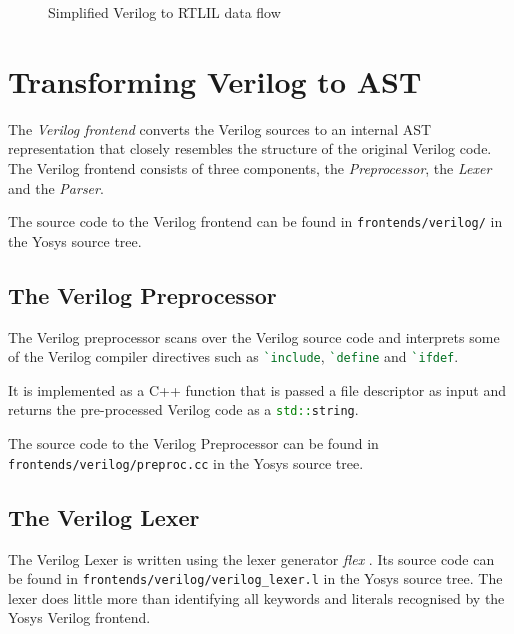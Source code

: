 \begin{figure}[b!]
	\caption{Simplified Verilog to RTLIL data flow}
	\label{fig:Verilog_flow}
\end{figure}


\section{Transforming Verilog to AST}

The {\it Verilog frontend} converts the Verilog sources to an internal AST representation that closely resembles
the structure of the original Verilog code. The Verilog frontend consists of three components, the
{\it Preprocessor}, the {\it Lexer} and the {\it Parser}.

The source code to the Verilog frontend can be found in {\tt frontends/verilog/} in the Yosys source tree.

\subsection{The Verilog Preprocessor}

The Verilog preprocessor scans over the Verilog source code and interprets some of the Verilog compiler
directives such as \lstinline[language=Verilog]{`include}, \lstinline[language=Verilog]{`define} and
\lstinline[language=Verilog]{`ifdef}.

It is implemented as a C++ function that is passed a file descriptor as input and returns the
pre-processed Verilog code as a \lstinline[language=C++]{std::string}.

The source code to the Verilog Preprocessor can be found in {\tt
frontends/verilog/preproc.cc} in the Yosys source tree.

\subsection{The Verilog Lexer}

\begin{sloppypar}
The Verilog Lexer is written using the lexer generator {\it flex} . Its source code
can be found in {\tt frontends/verilog/verilog\_lexer.l} in the Yosys source tree.
The lexer does little more than identifying all keywords and literals
recognised by the Yosys Verilog frontend.
\end{sloppypar}

